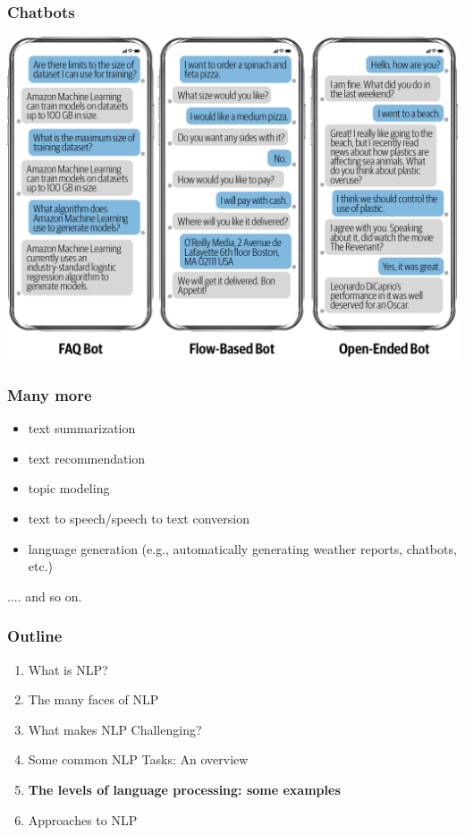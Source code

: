 \documentclass{beamer}
\begin{document}
\begin{frame}
\frametitle{Chatbots}
\includegraphics[width=\textwidth]{figures/chatbots.png}
\end{frame}

\begin{frame}
\frametitle{Many more}
\begin{itemize}
\item text summarization
\item text recommendation
\item topic modeling
\item text to speech/speech to text conversion
\item language generation (e.g., automatically generating weather reports, chatbots, etc.)
\end{itemize}
.... and so on.
\end{frame}

\begin{frame}
\frametitle{Outline}
\begin{enumerate}
    \item What is NLP?
    \item The many faces of NLP
    \item What makes NLP Challenging?
    \item Some common NLP Tasks: An overview
    \item \textbf{The levels of language processing: some examples}
    \item Approaches to NLP
\end{enumerate}
\end{frame}
\end{document}
